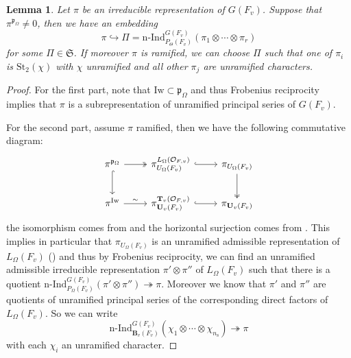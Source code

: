 \documentclass[12pt,oneside,reqno]{amsart}
\theoremstyle{plain}
\newtheorem{lemma}[theorem]{Lemma}
\begin{document}
	
	\begin{lemma}\label{Iwahori spherical representations}
		Let $\pi$ be an irreducible representation of $ G(F_v)$. Suppose that
		$\pi^{\mathfrak{p}_\Omega}\ne0$, then we have an embedding
		\[
		\pi
		\hookrightarrow
		\Pi=\mathrm{n}\text{-}\mathrm{Ind}_{P_\Theta(F_v)}^{ G(F_v)}
		(\pi_1\otimes\cdots\otimes\pi_r)
		\]
		for some $\Pi\in\mathfrak{S}$. If moreover $\pi$ is ramified, we can choose $\Pi$ such that one of $\pi_i$ is $\mathrm{St}_2(\chi)$ with $\chi$
		unramified and all other $\pi_j$ are unramified characters.
		
		
	\end{lemma}
	\begin{proof}
		For the first part, note that $\mathrm{Iw}\subset\mathfrak{p}_{\Omega}$
		and thus Frobenius reciprocity implies that $\pi$ is a subrepresentation of unramified principal series of $ G(F_v)$.
		
		
		
		
		For the second part, assume $\pi$ ramified, then we have the following commutative diagram:
		\[
		\begin{tikzcd}
			\pi^{\mathfrak{p}_{\Omega}}
			\arrow[r,twoheadrightarrow]
			\arrow[d,hookrightarrow]
			&
			\pi_{U_{\Omega}(F_v)}^{L_{\Omega}(\mathcal{O}_{F,v})}
			\arrow[r,hookrightarrow]
			&
			\pi_{U_{\Omega}(F_v)}
			\arrow[d,twoheadrightarrow]
			\\
			\pi^{\mathrm{Iw}}
			\arrow[r,"\sim"]
			&
			\pi_{\mathbf{U}_v(F_v)}^{\mathbf{T}_v(\mathcal{O}_{F,v})}
			\arrow[r,hookrightarrow]
			&
			\pi_{\mathbf{U}_v(F_v)}
		\end{tikzcd}
		\]
		the isomorphism comes from \cite[Lemma 4.7]{Borel1976} and the horizontal surjection comes from \cite[Theorem 3.3.3]{Casselman1995}. This implies in particular that $\pi_{U_{\Omega}(F_v)}$ is an unramified admissible representation of $L_{\Omega}(F_v)$ (\cite[Theorem 3.3.1]{Casselman1995})
		and thus by Frobenius reciprocity, we can find an unramified admissible irreducible representation $\pi'\otimes\pi''$ of $L_{\Omega}(F_v)$ such that there is a quotient $\mathrm{n}\text{-}\mathrm{Ind}_{P_{\Omega}(F_v)}^{ G(F_v)}(\pi'\otimes\pi'')\twoheadrightarrow\pi$. Moreover we know that
		$\pi'$ and $\pi''$ are quotients of unramified principal series of the
		corresponding direct factors of $L_{\Omega}(F_v)$. So we can write
		\[
		\mathrm{n}\text{-}\mathrm{Ind}_{\mathbf{B}_v(F_v)}^{ G(F_v)}
		(\chi_1\otimes\cdots\otimes\chi_{n_{\mathrm{s}}})
		\twoheadrightarrow
		\pi
		\]
		with each $\chi_i$ an unramified character.
		

\end{proof}
\end{document}
